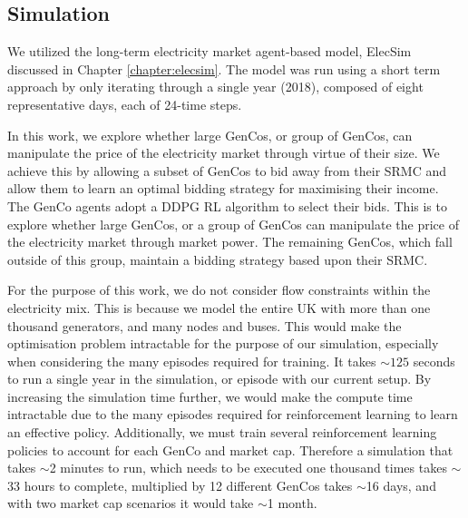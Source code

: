 \subsection{Simulation}

We utilized the long-term electricity market agent-based model, ElecSim \cite{Kell,Kell2020} discussed in Chapter \ref{chapter:elecsim}. The model was run using a short term approach by only iterating through a single year (2018), composed of eight representative days, each of 24-time steps.





In this work, we explore whether large GenCos, or group of GenCos, can manipulate the price of the electricity market through virtue of their size. We achieve this by allowing a subset of GenCos to bid away from their SRMC and allow them to learn an optimal bidding strategy for maximising their income. The GenCo agents adopt a DDPG RL algorithm to select their bids. This is to explore whether large GenCos, or a group of GenCos can manipulate the price of the electricity market through market power. The remaining GenCos, which fall outside of this group, maintain a bidding strategy based upon their SRMC.

For the purpose of this work, we do not consider flow constraints within the electricity mix. This is because we model the entire UK with more than one thousand generators, and many nodes and buses. This would make the optimisation problem intractable for the purpose of our simulation, especially when considering the many episodes required for training. It takes ${\sim}125$ seconds to run a single year in the simulation, or episode with our current setup. By increasing the simulation time further, we would make the compute time intractable due to the many episodes required for reinforcement learning to learn an effective policy. Additionally, we must train several reinforcement learning policies to account for each GenCo and market cap. Therefore a simulation that takes ${\sim}$2 minutes to run, which needs to be executed one thousand times takes ${\sim}$33 hours to complete, multiplied by 12 different GenCos takes ${\sim}$16 days, and with two market cap scenarios it would take ${\sim}$1 month.



